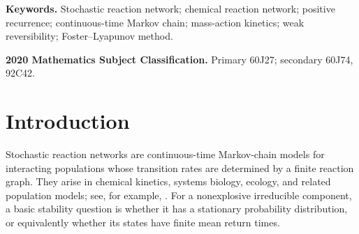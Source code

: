 \begin{abstract}
Stochastic reaction networks model interacting populations through random
reaction events.  Weak reversibility is widely expected to prevent such
systems from escaping indefinitely, but this was not known even for
second-order networks with a connected reaction graph unless every species
appeared in a special pure-species complex.  We remove that additional
restriction.  For all positive reaction rates, every closed component of the
state space has finite mean return times and a unique stationary probability
distribution; the construction also rules out explosion within each such
component.
\end{abstract}

\noindent\textbf{Keywords.}
Stochastic reaction network; chemical reaction network; positive recurrence;
continuous-time Markov chain; mass-action kinetics; weak reversibility;
Foster--Lyapunov method.

\medskip
\noindent\textbf{2020 Mathematics Subject Classification.}
Primary 60J27; secondary 60J74, 92C42.

\section{Introduction}\label{sec:intro}

Stochastic reaction networks are continuous-time Markov-chain models for
interacting populations whose transition rates are determined by a finite
reaction graph.  They arise in chemical kinetics, systems biology, ecology,
and related population models; see, for example,
\citet{AndersonKurtz2015}.  For a nonexplosive irreducible component, a basic
stability question is whether it has a stationary probability distribution,
or equivalently whether its states have finite mean return times.

